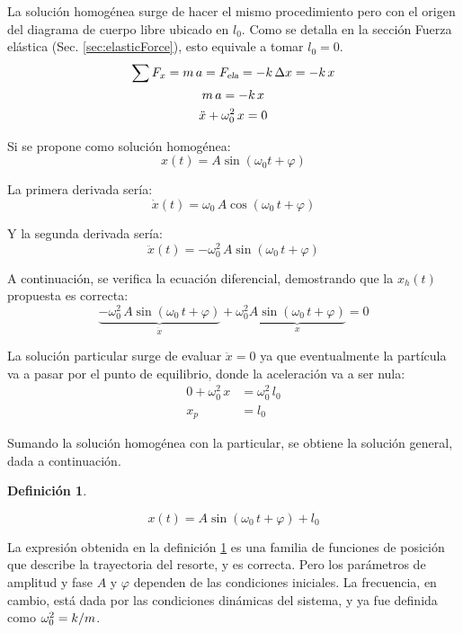 \documentclass[a5paper,12pt,twoside]{book}
\newtheorem{defn}{{Definición}}[chapter]
\begin{document}
La solución homogénea surge de hacer el mismo procedimiento pero con el origen del diagrama de cuerpo libre ubicado en $l_0$.
Como se detalla en la sección Fuerza elástica (Sec. \ref{sec:elasticForce}), esto equivale a tomar $l_0 = 0$.
\begin{gather*}
    \sum F_x = m \, a = {{F}_\textsl{{ela}}} = - k \, \Delta x = -k \, x
    \\
    m \, a = - k \, x
    \\
    \ddot{x} + \omega_0^2 \, x = 0
\end{gather*}

Si se propone como solución homogénea:
\[ x(t) = A \sin{(\omega_0 t + \varphi)} \]

La primera derivada sería:
\[ \dot{x}(t) = \omega_0 \, A \cos{(\omega_0 \, t + \varphi)} \]

Y la segunda derivada sería:
\[ \ddot{x}(t) = - \omega_0^2 \, A \sin{(\omega_0 \, t + \varphi)} \]

A continuación, se verifica la ecuación diferencial, demostrando que la $x_h(t)$ propuesta es correcta:
\[
    \underbrace{- \omega_0^2 \, A \sin{(\omega_0 \, t + \varphi)}}_{\ddot{x}} + \omega_0^2 \underbrace{A \sin{(\omega_0 \, t + \varphi)}}_{x} = 0
\]

La solución particular surge de evaluar $\ddot{x} = 0$ ya que eventualmente la partícula va a pasar por el punto de equilibrio, donde la aceleración va a ser nula:
\begin{align*}
    0 + \omega_0^2 \, x &= \omega_0^2 \, l_0 
    \\
    x_p &= l_0
\end{align*}

Sumando la solución homogénea con la particular, se obtiene la solución general, dada a continuación.

\begin{mdframed}[style=MyFrame1]
    \begin{defn}
        \label{defn:solMAShorizontal}
    \end{defn}
    \begin{equation*}
        x(t) = A \sin{(\omega_0 \, t + \varphi)} + l_0
    \end{equation*}
\end{mdframed}

La expresión obtenida en la definición \ref{defn:solMAShorizontal} es una familia de funciones de posición que describe la trayectoria del resorte, y es correcta.
Pero los parámetros de amplitud y fase $A$ y $\varphi$ dependen de las condiciones iniciales.
La frecuencia, en cambio, está dada por las condiciones dinámicas del sistema, y ya fue definida como $\omega_0^2 = k/m$.
\end{document}
